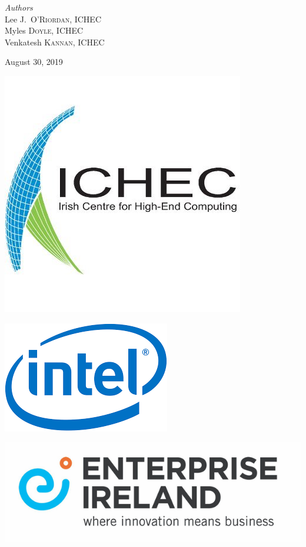 \documentclass[11pt]{article}
\begin{document}
\begin{titlepage}
\vfill
\begin{center} \large
\emph{Authors}\\[0.5cm]
Lee J.~\textsc{O'Riordan}, ICHEC\\[0.2cm]
Myles \textsc{Doyle}, ICHEC\\[0.2cm]
Venkatesh \textsc{Kannan}, ICHEC
\end{center}
\vfill
{\large August 30, 2019}\\[1cm] 
\vfill
\hfill
\begin{minipage}{0.4\textwidth}
  \begin{center}
    \includegraphics[scale=0.3]{ichec_logo.jpeg}
  \end{center}
\end{minipage}
\hfill
\begin{minipage}{0.4\textwidth}
  \begin{center}
    \includegraphics[scale=0.3]{intel_logo.png}
  \end{center}
\end{minipage}
\vfill
\includegraphics[scale=0.3]{ei_logo.JPG}
\vfill
\end{titlepage}
\end{document}
